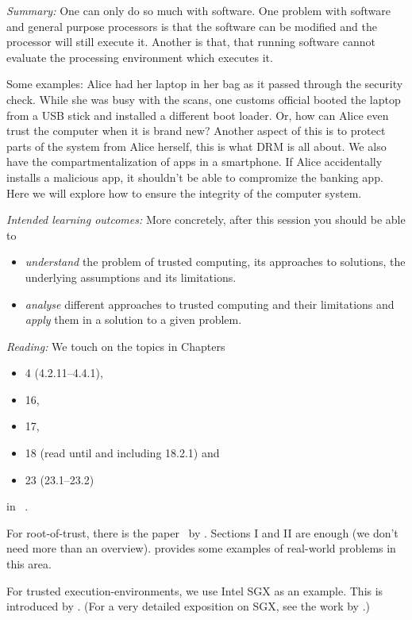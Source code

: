 \emph{Summary:}
One can only do so much with software.
One problem with software and general purpose processors is that the software 
can be modified and the processor will still execute it.
Another is that, that running software cannot evaluate the processing 
environment which executes it.

Some examples: Alice had her laptop in her bag as it passed through the 
security check.
While she was busy with the scans, one customs official booted the laptop from 
a USB stick and installed a different boot loader.
Or, how can Alice even trust the computer when it is brand new?
Another aspect of this is to protect parts of the system from Alice herself, 
\eg this is what \ac{DRM} is all about.
We also have the compartmentalization of apps in a smartphone.
If Alice accidentally installs a malicious app, it shouldn't be able to 
compromize the banking app.
Here we will explore how to ensure the integrity of the computer system.

\emph{Intended learning outcomes:}
More concretely, after this session you should be able to
\begin{itemize}
  \item \emph{understand} the problem of trusted computing, its approaches to 
    solutions, the underlying assumptions and its limitations.
  \item \emph{analyse} different approaches to trusted computing and their 
    limitations and \emph{apply} them in a solution to a given problem.
\end{itemize}

\emph{Reading:}
We touch on the topics in Chapters
\begin{itemize}
  \item 4 (4.2.11--4.4.1),
  \item 16,
  \item 17,
  \item 18 (read until and including 18.2.1) and
  \item 23 (23.1--23.2)
\end{itemize}
in ~\cite{Anderson2008sea}.

For root-of-trust, there is the 
paper~\cite{EstablishRootOfTrustUnconditionally} by 
\citeauthor{EstablishRootOfTrustUnconditionally}.
Sections I and II are enough (we don't need more than an overview).
\Textcite{HDDmalware,USBmalware,BIOSmalware} provides some examples of 
real-world problems in this area.

For trusted execution-environments, we use Intel SGX as an example.
This is introduced by \textcite{IntelSGXTutorial}.
(For a very detailed exposition on SGX, see the work by 
\textcite{IntelSGXExplained}.)
